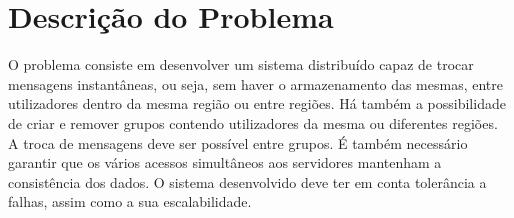 \chapter{Descrição do Problema}

O problema consiste em desenvolver um sistema distribuído capaz de trocar mensagens instantâneas, ou seja, sem haver o armazenamento das mesmas, entre utilizadores dentro da mesma região ou entre regiões. Há também a possibilidade de criar e remover grupos contendo utilizadores da mesma ou diferentes regiões. A troca de mensagens deve ser possível entre grupos. É também necessário garantir que os vários acessos simultâneos aos servidores mantenham a consistência dos dados. O sistema desenvolvido deve ter em conta tolerância a falhas, assim como a sua escalabilidade.